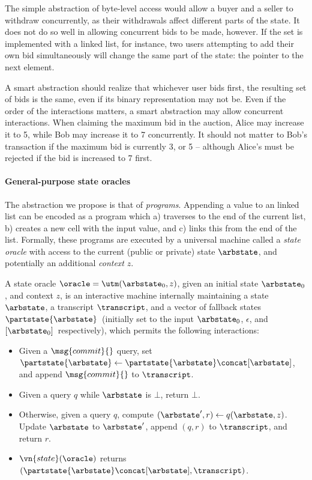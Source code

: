 The simple abstraction of byte-level access would allow a buyer and a seller
to withdraw concurrently, as their withdrawals affect different parts of the
state. It does not do so well in allowing concurrent bids to be made, however.
If the set is implemented with a linked list, for instance, two users attempting
to add their own bid simultaneously will change the same part of the state: the
pointer to the next element.

A smart abstraction should realize that whichever user bids first, the resulting
set of bids is the same, even if its binary representation may not be. Even if
the order of the interactions matters, a smart abstraction may allow concurrent
interactions. When claiming the maximum bid in the auction, Alice may increase
it to 5, while Bob may increase it to 7 concurrently. It should not matter to
Bob's transaction if the maximum bid is currently 3, or 5 -- although Alice's
must be rejected if the bid is increased to 7 first.

\paragraph{General-purpose state oracles}

The abstraction we propose is that of \emph{programs}. Appending a value to an
linked list can be encoded as a program which a) traverses to the end of the
current list, b) creates a new cell with the input value, and c) links this from
the end of the list. Formally, these programs are executed by a universal
machine called a \emph{state oracle} with access to the current (public or
private) state $\arbstate$, and potentially an additional \emph{context} $z$.

\begin{definition}
  \label{def:oracle}
  A state oracle $\oracle = \utm(\arbstate_0, z)$, given an initial state
  $\arbstate_0$, and context $z$, is an interactive machine internally
  maintaining a state $\arbstate$, a transcript $\transcript$, and a vector
    of fallback states $\partstate{\arbstate}$\ (initially set to the input
  $\arbstate_0$, $\epsilon$, and $[\arbstate_0]$\ respectively), which
  permits the following interactions:
  \begin{itemize}
    \item Given a $\msg{commit}{}$ query, set $\partstate{\arbstate} \gets
        \partstate{\arbstate} \concat [\arbstate]$, and append $\msg{commit}{}$ to
        $\transcript$.
    \item Given a query $q$ while $\arbstate$ is $\bot$, return $\bot$.
    \item Otherwise, given a query $q$, compute $(\arbstate', r) \gets q(\arbstate, z)$.
      Update $\arbstate$ to $\arbstate'$, append $(q, r)$ to $\transcript$, and
      return $r$.
    \item $\vn{state}(\oracle)$ returns $(\partstate{\arbstate} \concat [\arbstate], \transcript)$.
  \end{itemize}
\end{definition}

